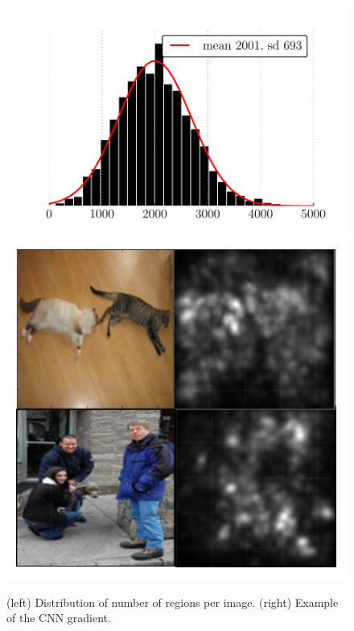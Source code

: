\begin{figure}
\centering
\includegraphics[width=0.52\linewidth]{figures/roi_hist.pdf}
\hfill
\includegraphics[width=0.4\linewidth]{figures/gradient.pdf}
\caption{
(left) Distribution of number of regions per image.
(right) Example of the CNN gradient.
}\label{fig:roi_hist_and_gradient}
\end{figure}
